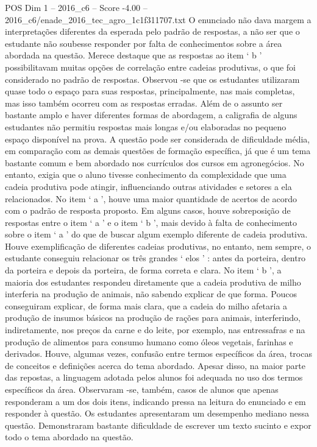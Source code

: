 \begin{textsample}{POS Dim 1 – 2016\_c6 – Score -4.00 – 2016\_c6/enade\_2016\_tec\_agro\_1c1f311707.txt}
O enunciado não dava margem a interpretações diferentes da esperada pelo padrão de respostas, a não ser que o estudante não soubesse responder por falta de conhecimentos sobre a área abordada na questão.
Merece destaque que as respostas ao item ‘ b ’ possibilitavam muitas opções de correlação entre cadeias produtivas, o que foi considerado no padrão de respostas.
Observou -se que os estudantes utilizaram quase todo o espaço para suas respostas, principalmente, nas mais completas, mas isso também ocorreu com as respostas erradas.
Além de o assunto ser bastante amplo e haver diferentes formas de abordagem, a caligrafia de alguns estudantes não permitiu respostas mais longas e/ou elaboradas no pequeno espaço disponível na prova.
A questão pode ser considerada de dificuldade média, em comparação com as demais questões de formação específica, já que é um tema bastante comum e bem abordado nos currículos dos cursos em agronegócios.
No entanto, exigia que o aluno tivesse conhecimento da complexidade que uma cadeia produtiva pode atingir, influenciando outras atividades e setores a ela relacionados.
No item ‘ a ’, houve uma maior quantidade de acertos de acordo com o padrão de resposta proposto.
Em alguns casos, houve sobreposição de respostas entre o item ‘ a ’ e o item ‘ b ’, mais devido à falta de conhecimento sobre o item ‘ a ’ do que de buscar algum exemplo diferente de cadeia produtiva.
Houve exemplificação de diferentes cadeias produtivas, no entanto, nem sempre, o estudante conseguiu relacionar os três grandes ‘ elos ’ : antes da porteira, dentro da porteira e depois da porteira, de forma correta e clara.
No item ‘ b ’, a maioria dos estudantes respondeu diretamente que a cadeia produtiva de milho interferia na produção de animais, não sabendo explicar de que forma.
Poucos conseguiram explicar, de forma mais clara, que a cadeia do milho afetaria a produção de insumos básicos na produção de rações para animais, interferindo, indiretamente, nos preços da carne e do leite, por exemplo, nas entressafras e na produção de alimentos para consumo humano como óleos vegetais, farinhas e derivados.
Houve, algumas vezes, confusão entre termos específicos da área, trocas de conceitos e definições acerca do tema abordado.
Apesar disso, na maior parte das repostas, a linguagem adotada pelos alunos foi adequada no uso dos termos específicos da área.
Observaram -se, também, casos de alunos que apenas responderam a um dos dois itens, indicando pressa na leitura do enunciado e em responder à questão.
Os estudantes apresentaram um desempenho mediano nessa questão.
Demonstraram bastante dificuldade de escrever um texto sucinto e expor todo o tema abordado na questão.

\end{textsample}
